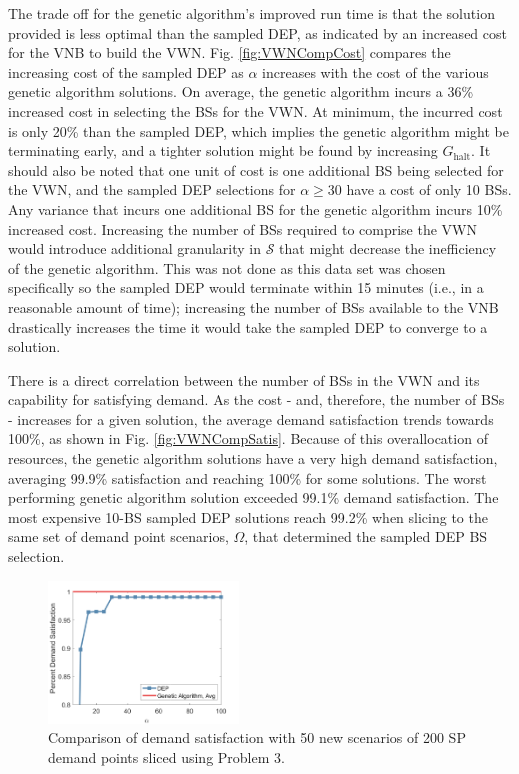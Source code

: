 \documentclass[conference]{IEEEtran}
\begin{document}
The trade off for the genetic algorithm's improved run time is that the solution provided is less optimal than the sampled DEP, as indicated by an increased cost for the VNB to build the VWN.  Fig. \ref{fig:VWNCompCost} compares the increasing cost of the sampled DEP as $\alpha$ increases with the cost of the various genetic algorithm solutions.  On average, the genetic algorithm incurs a 36\% increased cost in selecting the BSs for the VWN.  At minimum, the incurred cost is only 20\% than the sampled DEP, which implies the genetic algorithm might be terminating early, and a tighter solution might be found by increasing $G_\text{halt}$.  It should also be noted that one unit of cost is one additional BS being selected for the VWN, and the sampled DEP selections for $\alpha \geq 30$ have a cost of only 10 BSs.  Any variance that incurs one additional BS for the genetic algorithm incurs 10\% increased cost.  Increasing the number of BSs required to comprise the VWN would introduce additional granularity in $\mathcal{S}$ that might decrease the inefficiency of the genetic algorithm.  This was not done as this data set was chosen specifically so the sampled DEP would terminate within 15 minutes (i.e., in a reasonable amount of time); increasing the number of BSs available to the VNB drastically increases the time it would take the sampled DEP to converge to a solution.

There is a direct correlation between the number of BSs in the VWN and its capability for satisfying demand.  As the cost - and, therefore, the number of BSs - increases for a given solution, the average demand satisfaction trends towards 100\%, as shown in Fig. \ref{fig:VWNCompSatis}.  Because of this overallocation of resources, the genetic algorithm solutions have a very high demand satisfaction, averaging 99.9\% satisfaction and reaching 100\% for some solutions.  The worst performing genetic algorithm solution exceeded 99.1\% demand satisfaction.  The most expensive 10-BS sampled DEP solutions reach 99.2\% when slicing to the same set of demand point scenarios, $\Omega$, that determined the sampled DEP BS selection.

\begin{figure}
	\centering
	\includegraphics[width=0.45\textwidth]{Figures/ComparisonSatisfactionEval}
	\caption{Comparison of demand satisfaction with 50 new scenarios of 200 SP demand points sliced using Problem 3.}
	\label{fig:VWNEvalCompSatis}
\end{figure}
\end{document}
